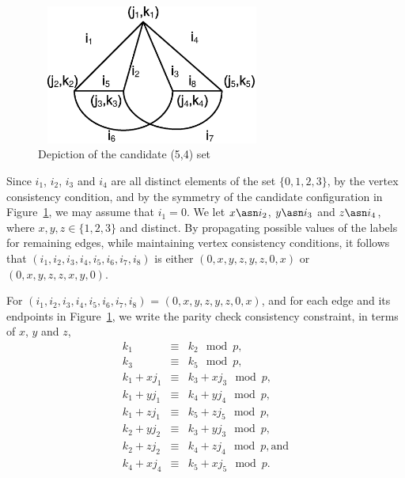 
\begin{figure}
\center\includegraphics[width=3.0in,height=1.8in]{Drawing22_1.eps}
\caption{Depiction of the candidate (5,4) set} \label{fig52}
\end{figure}

Since $i_1$, $i_2$, $i_3$ and $i_4$ are all distinct elements of
the set $\{0,1,2,3\}$, by the vertex consistency condition, and by
the symmetry of the candidate configuration in Figure~\ref{fig52},
we may assume that $i_1=0$. We let $x \asn i_2$, $y \asn i_3$ and
$z \asn i_4$, where $x,y,z \in \{1,2,3 \}$ and distinct. By
propagating possible values of the labels for remaining edges,
while maintaining vertex consistency conditions, it follows that
$(i_1,i_2,i_3,i_4,i_5,i_6,i_7,i_8)$ is either $(0,x,y,z,y,z,0,x)$
or $(0,x,y,z,z,x,y,0)$.

For $(i_1,i_2,i_3,i_4,i_5,i_6,i_7,i_8)$ = $(0,x,y,z,y,z,0,x)$, and
for each edge and its endpoints in Figure~\ref{fig52}, we write the
parity check consistency constraint, in terms of $x$, $y$ and $z$,
\begin{subequations}\label{eq52a}\begin{eqnarray}
\label{eq52a1}k_1 &\equiv& k_2 \mod p,\\
\label{eq52a2}k_3 &\equiv& k_5 \mod p,\\
\label{eq52a3}k_1+xj_1 &\equiv& k_3+xj_3 \mod p, \\
\label{eq52a4}k_1+yj_1 &\equiv& k_4+yj_4 \mod p, \\
\label{eq52a5}k_1+zj_1 &\equiv& k_5+zj_5 \mod p, \\
\label{eq52a6}k_2+yj_2 &\equiv& k_3+yj_3 \mod p, \\
\label{eq52a7}k_2+zj_2 &\equiv& k_4+zj_4 \mod p, \text{and}\\
\label{eq52a8}k_4+xj_4 &\equiv& k_5+xj_5 \mod p.
\end{eqnarray}\end{subequations}

